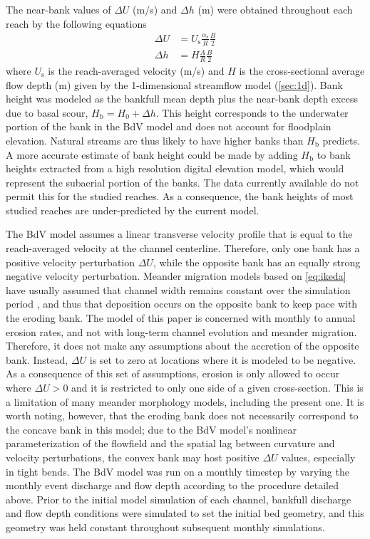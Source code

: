 \documentclass[preprint, review, authoryear, 12pt]{elsarticle}
\begin{document}
The near-bank values of $\Delta U$ (m/s) and $\Delta h$ (m) were obtained throughout each reach by the following equations
\begin{align}
\Delta U &= U_\text{s}\frac{\alpha_\text{s}}{R}\frac{B}{2}\\[0.5em]
\Delta h &= H\frac{A}{R}\frac{B}{2}
\end{align}
where $U_\text{s}$ is the reach-averaged velocity (m/s) and $H$ is the cross-sectional average flow depth (m) given by the 1-dimensional streamflow model (\cref{sec:1d}). Bank height was modeled as the bankfull mean depth plus the near-bank depth excess due to basal scour, $H_\text{b} = H_{0} + \Delta h$. This height corresponds to the underwater portion of the bank in the BdV model and does not account for floodplain elevation. Natural streams are thus likely to have higher banks than $H_\text{b}$ predicts. A more accurate estimate of bank height could be made by adding $H_\text{b}$ to bank heights extracted from a high resolution digital elevation model, which would represent the subaerial portion of the banks. The data currently available do not permit this for the studied reaches. As a consequence, the bank heights of most studied reaches are under-predicted by the current model.

The BdV model assumes a linear transverse velocity profile that is equal to the reach-averaged velocity at the channel centerline. Therefore, only one bank has a positive velocity perturbation $\Delta U$, while the opposite bank has an equally strong negative velocity perturbation. Meander migration models based on \cref{eq:ikeda} have usually assumed that channel width remains constant over the simulation period \citep{Parker2011}, and thus that deposition occurs on the opposite bank to keep pace with the eroding bank. The model of this paper is concerned with monthly to annual erosion rates, and not with long-term channel evolution and meander migration. Therefore, it does not make any assumptions about the accretion of the opposite bank. Instead, $\Delta U$ is set to zero at locations where it is modeled to be negative. As a consequence of this set of assumptions, erosion is only allowed to occur where $\Delta U > 0$ and it is restricted to only one side of a given cross-section. This is a limitation of many meander morphology models, including the present one. It is worth noting, however, that the eroding bank does not necessarily correspond to the concave bank in this model; due to the BdV model's nonlinear parameterization of the flowfield and the spatial lag between curvature and velocity perturbations, the convex bank may host positive $\Delta U$ values, especially in tight bends. The BdV model was run on a monthly timestep by varying the monthly event discharge and flow depth according to the procedure detailed above. Prior to the initial model simulation of each channel, bankfull discharge and flow depth conditions were simulated to set the initial bed geometry, and this geometry was held constant throughout subsequent monthly simulations.
\end{document}
